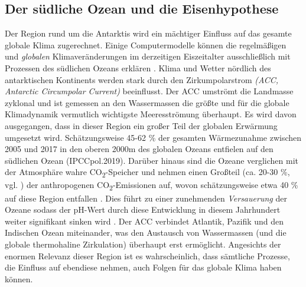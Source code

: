 \documentclass[12pt,a4paper,onecolumn,headheight=30pt]{scrartcl}
\newcommand{\cotwo}{CO\textsubscript{2}}
\begin{document}
\subsection{Der südliche Ozean und die Eisenhypothese} \label{sec:Eisenhypothese}
Der Region rund um die Antarktis wird ein mächtiger Einfluss auf das gesamte globale Klima zugerechnet. Einige Computermodelle können die regelmäßigen und \textit{globalen} Klimaveränderungen im derzeitigen Eiszeitalter ausschließlich mit Prozessen des südlichen Ozeans erklären \citep{Fischer.2010}. Klima und Wetter nördlich des antarktischen Kontinents werden stark durch den Zirkumpolarstrom \textit{(ACC, Antarctic Circumpolar Current)} beeinflusst. Der ACC umströmt die Landmasse zyklonal und ist gemessen an den Wassermassen die größte und für die globale Klimadynamik vermutlich wichtigste Meeresströmung überhaupt. Es wird davon ausgegangen, dass in dieser Region ein großer Teil der globalen Erwärmung umgesetzt wird. Schätzungsweise 45-62 \% der gesamten Wärmezunahme zwischen 2005 und 2017 in den oberen 2000m des globalen Ozeans entfielen auf den südlichen Ozean (IPCCpol.2019). Darüber hinaus sind die Ozeane verglichen mit der Atmosphäre wahre \cotwo -Speicher und nehmen einen Großteil (ca. 20-30 \%, vgl. \citep{IPCCpol.2019}) der anthropogenen \cotwo -Emissionen auf, wovon schätzungsweise etwa 40 \% auf diese Region entfallen \citep{Boning.2008}. Dies führt zu einer zunehmenden \textit{Versauerung} der Ozeane sodass der pH-Wert durch diese Entwicklung in diesem Jahrhundert weiter signifikant sinken wird \citep{IPCCpol.2019}. Der ACC verbindet Atlantik, Pazifik und den Indischen Ozean miteinander, was den Austausch von Wassermassen (und die globale thermohaline Zirkulation) überhaupt erst ermöglicht. Angesichts der enormen Relevanz dieser Region ist es wahrscheinlich, dass sämtliche Prozesse, die Einfluss auf ebendiese nehmen, auch Folgen für das globale Klima haben können.
\end{document}
